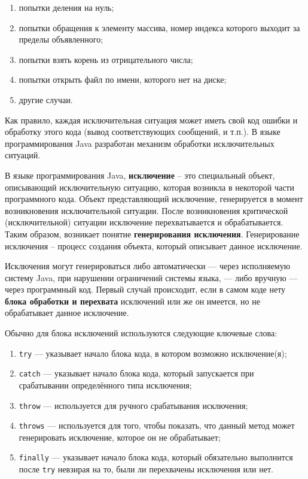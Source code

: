 \begin{enumerate}
    \item попытки деления на нуль;
    \item попытки обращения к элементу массива, номер индекса которого выходит за пределы объявленного;
    \item попытки взять корень из отрицательного числа;
    \item попытки открыть файл по имени, которого нет на диске;
    \item другие случаи.
\end{enumerate}

Как правило, каждая исключительная ситуация может иметь свой код ошибки и обработку этого кода (вывод соответствующих сообщений, и т.п.). В языке программирования Java разработан механизм обработки исключительных ситуаций.

В языке программирования Java, \textbf{исключение} – это специальный объект, описывающий исключительную ситуацию, которая возникла в некоторой части программного кода. Объект представляющий исключение, генерируется в момент возникновения исключительной ситуации. После возникновения критической (исключительной) ситуации исключение перехватывается и обрабатывается. Таким образом, возникает понятие \textbf{ генерирования исключения}. Генерирование исключения – процесс создания объекта, который описывает данное исключение.

Исключения могут генерироваться либо автоматически — через исполняемую систему Java, при нарушении ограничений системы языка, — либо вручную — через программный код. Первый случай происходит, если в самом коде нету \textbf{блока обработки и перехвата} исключений или же он имеется, но не обрабатывает данное исключение.

Обычно для блока исключений используются следующие ключевые слова:

\begin{enumerate}
    \item \verb|try| — указывает начало блока кода, в котором возможно исключение(я);
    \item \verb|catch| — указывает начало блока кода, который запускается при срабатывании определённого типа исключения;
    \item \verb|throw| — используется для ручного срабатывания исключения;
    \item \verb|throws| — используется для того, чтобы показать, что данный метод может генерировать исключение, которое он не обрабатывает;
    \item \verb|finally| — указывает начало блока кода, который обязательно выполнится после \verb|try| невзирая на то, были ли перехвачены исключения или нет.
\end{enumerate}

